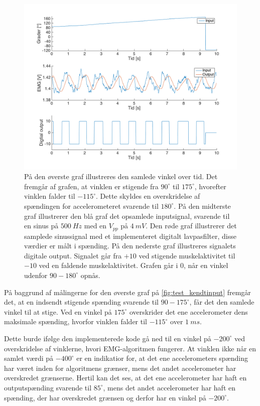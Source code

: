 \begin{figure}[H]
\centering
\includegraphics[width=1\textwidth]{figures/kontrol_test_sinus}
\caption{På den øverste graf illustreres den samlede vinkel over tid. Det fremgår af grafen, at vinklen er stigende fra $90^{\circ}$ til $175^{\circ}$, hvorefter vinklen falder til $-115^{\circ}$. Dette skyldes en overskridelse af spændingen for accelerometeret svarende til $180^{\circ}$.
På den midterste graf illustrerer den blå graf det opsamlede inputsignal, svarende til en sinus på $500~Hz$ med en $V_{pp}$ på $4~mV$. Den røde graf illustrerer det samplede sinussignal med et implementeret digitalt lavpasfilter, disse værdier er målt i spænding. 
På den nederste graf illustreres signalets digitale output. Signalet går fra $+10$ ved stigende muskelaktivitet til $-10$ ved en faldende muskelaktivitet. Grafen går i $0$, når en vinkel udenfor $90-180^{\circ}$ opnås.}
\label{fig:test_kendtinput}
\end{figure}

\noindent
På baggrund af målingerne for den øverste graf på \autoref{fig:test_kendtinput} fremgår det, at en indsendt stigende spænding svarende til $90-175^{\circ}$, får det den samlede vinkel til at stige. Ved en vinkel på $175^{\circ}$ overskrider det ene accelerometer dens maksimale spænding, hvorfor vinklen falder til $-115^{\circ}$ over $1~ms$. 

Dette burde ifølge den implementerede kode gå ned til en vinkel på $-200^{\circ}$ ved overskridelse af vinklerne, hvori EMG-algoritmen fungerer. 
At vinklen ikke når en samlet værdi på $-400^{\circ}$ er en indikatior for, at det ene accelerometers spænding har været inden for algoritmens grænser, mens det andet accelerometer har overskredet grænserne. Hertil kan det ses, at det ene accelerometer har haft en outputspænding svarende til $85^{\circ}$, mens det andet accelerometer har haft en spænding, der har overskredet grænsen og derfor har en vinkel på $-200^{\circ}$.

